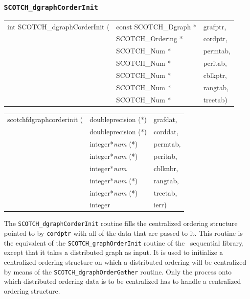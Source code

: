 \subsubsection{{\tt SCOTCH\_dgraphCorderInit}}
\label{sec-lib-graph-corder-init}

\begin{itemize}
\progsyn

{\tt\begin{tabular}{l@{}ll}
int SCOTCH\_dgraphCorderInit ( & const SCOTCH\_Dgraph * & grafptr, \\
                               & SCOTCH\_Ordering *     & cordptr, \\
                               & SCOTCH\_Num *          & permtab, \\
                               & SCOTCH\_Num *          & peritab, \\
                               & SCOTCH\_Num *          & cblkptr, \\
                               & SCOTCH\_Num *          & rangtab, \\
                               & SCOTCH\_Num *          & treetab)
\end{tabular}}

{\tt\begin{tabular}{l@{}ll}
scotchfdgraphcorderinit ( & doubleprecision (*)   & grafdat, \\
                          & doubleprecision (*)   & corddat, \\
                          & integer*{\it num} (*) & permtab, \\
                          & integer*{\it num} (*) & peritab, \\
                          & integer*{\it num}     & cblknbr, \\
                          & integer*{\it num} (*) & rangtab, \\
                          & integer*{\it num} (*) & treetab, \\
                          & integer               & ierr)
\end{tabular}}

\progdes

The {\tt SCOTCH\_dgraph\lbt Corder\lbt Init} routine fills the
centralized ordering structure pointed to by {\tt cordptr} with all of
the data that are passed to it. This routine is the equivalent of the
{\tt SCOTCH\_\lbt graph\lbt Order\lbt Init} routine of the
\scotch\ sequential library, except that it takes a distributed graph
as input. It is used to initialize a centralized ordering structure on
which a distributed ordering will be centralized by means of the
{\tt SCOTCH\_\lbt dgraph\lbt Order\lbt Gather} routine. Only the
process onto which distributed ordering data is to be centralized has
to handle a centralized ordering structure.


\end{itemize}
